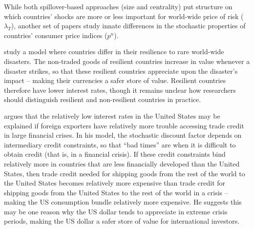 \documentclass{ar-1col}
\begin{document}
While both spillover-based approaches (size and centrality) put structure on which countries' shocks are more or less important for world-wide price of risk ($\lambda_T$), another set of papers study innate differences in the stochastic properties of countries' consumer price indices ($p^n$).

\citet{FarhiGabaix2016} study a model where countries differ in their resilience to rare world-wide disasters. The non-traded goods of resilient countries increase in value whenever a disaster strikes, so that these resilient countries appreciate upon the disaster's impact -- making their currencies a safer store of value. Resilient countries therefore have lower interest rates, though it remains unclear how researchers should distinguish resilient and non-resilient countries in practice.

\citet{Maggiori2013} argues that the relatively low interest rates in the United States may be explained if foreign exporters have relatively more trouble accessing trade credit in large financial crises. In his model, the stochastic discount factor depends on intermediary credit constraints, so that ``bad times'' are when it is difficult to obtain credit (that is, in a financial crisis). If these credit constraints bind relatively more in countries that are less financially developed than the United States, then trade credit needed for shipping goods from the rest of the world to the United States becomes relatively more expensive than trade credit for shipping goods from the United States to the rest of the world in a crisis -- making the US consumption bundle relatively more expensive. He suggests this may be one reason why the US dollar tends to appreciate in extreme crisis periods, making the US dollar a safer store of value for international investors.
\end{document}
